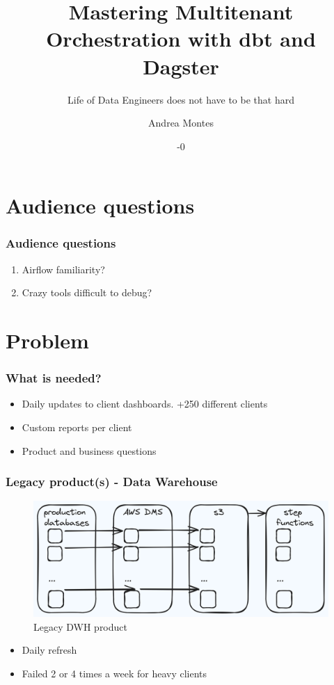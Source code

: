 \documentclass{beamer}
\title{Mastering Multitenant Orchestration with dbt and Dagster}
\subtitle{Life of Data Engineers does not have to be that hard}
\author{Andrea Montes}
\date{\the\year{}-0\the\month{}}
\institute{DBT Bogotá Meetup}
\begin{document}
\begin{frame}
    \titlepage
\end{frame}

\begin{frame}
    \tableofcontents
\end{frame}

\section{Audience questions}
\begin{frame}
    \frametitle{Audience questions}
    \begin{enumerate}
        \item Airflow familiarity?
        \item Crazy tools difficult to debug?
    \end{enumerate}
\end{frame}

\section{Problem}
\begin{frame}
    \frametitle{What is needed?}
    \begin{itemize}
        \item Daily updates to client dashboards. +250 different clients
        \item Custom reports per client
        \item Product and business questions
    \end{itemize}
\end{frame}

\begin{frame}
    \frametitle{Legacy product(s) - Data Warehouse}
    \begin{figure}
        \centering
        \includegraphics[width=1\textwidth]{pictures/legacy_product}
        \caption{Legacy DWH product}
    \end{figure}
    \begin{itemize}
        \item Daily refresh
        \item Failed 2 or 4 times a week for heavy clients 
    \end{itemize}
    \end{frame}
\end{document}
